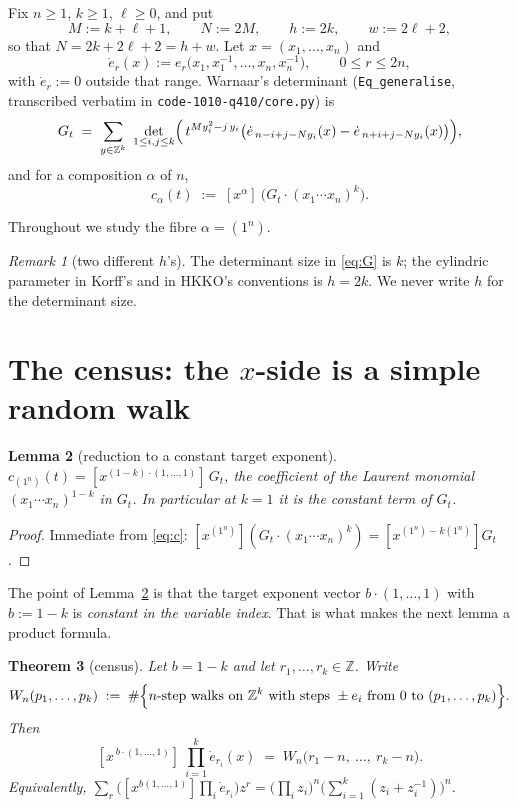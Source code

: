 \documentclass[11pt]{article}
\theoremstyle{plain}
\newtheorem{theorem}{Theorem}[section]
\newtheorem{lemma}[theorem]{Lemma}
\theoremstyle{definition}
\theoremstyle{remark}
\newtheorem{remark}[theorem]{Remark}
\newcommand{\Z}{\mathbb{Z}}
\newcommand{\edot}{\dot{e}}
\newcommand{\onen}{(1^{n})}
\begin{document}
Fix $n\ge1$, $k\ge1$, $\ell\ge0$, and put
\[
  M:=k+\ell+1,\qquad N:=2M,\qquad h:=2k,\qquad w:=2\ell+2 ,
\]
so that $N=2k+2\ell+2=h+w$. Let $x=(x_1,\dots,x_n)$ and
\[
  \edot_r(x):=e_r\bigl(x_1,x_1^{-1},\dots,x_n,x_n^{-1}\bigr),\qquad 0\le r\le 2n,
\]
with $\edot_r:=0$ outside that range. Warnaar's determinant
(\texttt{Eq\_generalise}, transcribed verbatim in \texttt{code-1010-q410/core.py}) is
\begin{equation}\label{eq:G}
  G_t \;=\; \sum_{y\in\Z^{k}}\ \det_{1\le i,j\le k}
     \Bigl(\, t^{M y_i^2-j\,y_i}\bigl(\edot_{\,n-i+j-Ny_i}(x)-\edot_{\,n+i+j-Ny_i}(x)\bigr)\Bigr),
\end{equation}
and for a composition $\alpha$ of $n$,
\begin{equation}\label{eq:c}
  c_\alpha(t)\;:=\;[x^{\alpha}]\ \bigl(G_t\cdot (x_1\cdots x_n)^{k}\bigr).
\end{equation}

Throughout we study the fibre $\alpha=\onen$.

\begin{remark}[two different $h$'s]
The determinant size in \eqref{eq:G} is $k$; the cylindric parameter in Korff's and in
HKKO's conventions is $h=2k$. We never write $h$ for the determinant size.
\end{remark}

\section{The census: the $x$-side is a simple random walk}\label{sec:census}

\begin{lemma}[reduction to a constant target exponent]\label{lem:reduce}
$c_\onen(t)=[x^{(1-k)\cdot(1,\dots,1)}]\,G_t$, the coefficient of the Laurent monomial
$(x_1\cdots x_n)^{1-k}$ in $G_t$. In particular at $k=1$ it is the constant term of $G_t$.
\end{lemma}

\begin{proof}
Immediate from \eqref{eq:c}: $[x^{(1^n)}](G_t\cdot(x_1\cdots x_n)^k)
=[x^{(1^n)-k(1^n)}]G_t$.
\end{proof}

The point of Lemma~\ref{lem:reduce} is that the target exponent vector
$b\cdot(1,\dots,1)$ with $b:=1-k$ is \emph{constant in the variable index}. That is what
makes the next lemma a product formula.

\begin{theorem}[census]\label{thm:census}
Let $b=1-k$ and let $r_1,\dots,r_k\in\Z$. Write
\[
  W_n(p_1,\dots,p_k)\;:=\;\#\Bigl\{\text{$n$-step walks on $\Z^k$ with steps }\pm e_i
     \text{ from } 0 \text{ to } (p_1,\dots,p_k)\Bigr\}.
\]
Then
\begin{equation}\label{eq:census}
  [x^{\,b\cdot(1,\dots,1)}]\ \prod_{i=1}^{k}\edot_{r_i}(x)\;=\;W_n\bigl(r_1-n,\ \dots,\ r_k-n\bigr).
\end{equation}
Equivalently, $\sum_{r}\bigl([x^{b(1,\dots,1)}]\prod_i\edot_{r_i}\bigr)z^{r}
=\bigl(\prod_i z_i\bigr)^{n}\bigl(\sum_{i=1}^{k}(z_i+z_i^{-1})\bigr)^{n}$.
\end{theorem}
\end{document}
